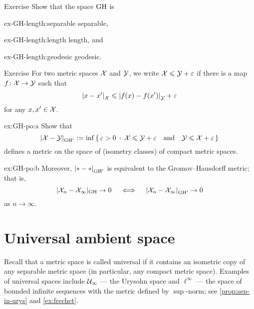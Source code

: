 \begin{thm}{Exercise}\label{ex-GH-length}
Show that the space $\operatorname{\rm GH}\nolimits$ is 
\begin{multicols}{3}

\begin{subthm}{ex-GH-length:separable}
separable,
\end{subthm}

\begin{subthm}{ex-GH-length:length}
length, and
\end{subthm}

\begin{subthm}{ex-GH-length:geodesic}
geodesic.
\end{subthm}

\end{multicols}


\end{thm}

\begin{thm}{Exercise}\label{ex:GH-po}
For two metric spaces $\mathcal{X}$ and $\mathcal{Y}$,
we write $\mathcal{X}\leqslant \mathcal{Y}+\varepsilon$ if
there is a map $f\colon\mathcal{X}\to \mathcal{Y}$ such that 
\[\dist{x}{x'}{\spc{X}}\le \dist{f(x)}{f(x')}{\spc{Y}}+\eps\]
for any $x,x'\in \mathcal{X}$.

\begin{subthm}{ex:GH-po:a}
Show that 
$$\dist{\spc{X}}{\spc{Y}}{\GH'}
\df
\inf\set{\eps>0}{\spc{X}\le \spc{Y}+\eps
\quad\text{and}\quad
\spc{Y}\le \spc{X}+\eps}$$
defines a metric on the space of (isometry classes) of compact metric spaces.
\end{subthm}

\begin{subthm}{ex:GH-po:b}
Moreover, $\dist{*}{*}{\GH'}$ is equivalent to the Gromov--Hausdorff metric;
that is,
$$|\spc{X}_n-\spc{X}_\infty|_{\GH}\to 0 
\quad\iff\quad 
\dist{\spc{X}_n}{\spc{X}_\infty}{\GH'}\to 0$$ 
as $n\to\infty$.
\end{subthm}
\end{thm}

\section{Universal ambient space}

Recall that a metric space is called universal if it contains an isometric copy of any separable metric space (in particular, any compact metric space).
Examples of universal spaces include $\mathcal{U}_\infty$ --- the Urysohn space and $\ell^\infty$ --- the space of bounded infinite sequences with the metric defined by $\sup$-norm; see \ref{prop:sep-in-urys} and \ref{ex:frechet}.

